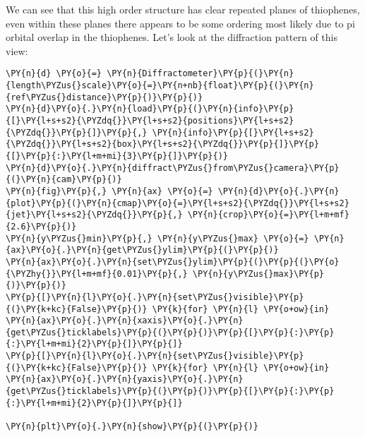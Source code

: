             
    
    \begin{center}
    \end{center}
    

    We can see that this high order structure has clear repeated planes of
thiophenes, even within these planes there appears to be some ordering
most likely due to pi orbital overlap in the thiophenes. Let's look at
the diffraction pattern of this view:

    \begin{tcolorbox}[breakable, size=fbox, boxrule=1pt, pad at break*=1mm,colback=cellbackground, colframe=cellborder]
\begin{Verbatim}[commandchars=\\\{\}]
\PY{n}{d} \PY{o}{=} \PY{n}{Diffractometer}\PY{p}{(}\PY{n}{length\PYZus{}scale}\PY{o}{=}\PY{n+nb}{float}\PY{p}{(}\PY{n}{ref\PYZus{}distance}\PY{p}{)}\PY{p}{)}
\PY{n}{d}\PY{o}{.}\PY{n}{load}\PY{p}{(}\PY{n}{info}\PY{p}{[}\PY{l+s+s2}{\PYZdq{}}\PY{l+s+s2}{positions}\PY{l+s+s2}{\PYZdq{}}\PY{p}{]}\PY{p}{,} \PY{n}{info}\PY{p}{[}\PY{l+s+s2}{\PYZdq{}}\PY{l+s+s2}{box}\PY{l+s+s2}{\PYZdq{}}\PY{p}{]}\PY{p}{[}\PY{p}{:}\PY{l+m+mi}{3}\PY{p}{]}\PY{p}{)}
\PY{n}{d}\PY{o}{.}\PY{n}{diffract\PYZus{}from\PYZus{}camera}\PY{p}{(}\PY{n}{cam}\PY{p}{)}
\PY{n}{fig}\PY{p}{,} \PY{n}{ax} \PY{o}{=} \PY{n}{d}\PY{o}{.}\PY{n}{plot}\PY{p}{(}\PY{n}{cmap}\PY{o}{=}\PY{l+s+s2}{\PYZdq{}}\PY{l+s+s2}{jet}\PY{l+s+s2}{\PYZdq{}}\PY{p}{,} \PY{n}{crop}\PY{o}{=}\PY{l+m+mf}{2.6}\PY{p}{)}
\PY{n}{y\PYZus{}min}\PY{p}{,} \PY{n}{y\PYZus{}max} \PY{o}{=} \PY{n}{ax}\PY{o}{.}\PY{n}{get\PYZus{}ylim}\PY{p}{(}\PY{p}{)}
\PY{n}{ax}\PY{o}{.}\PY{n}{set\PYZus{}ylim}\PY{p}{(}\PY{p}{(}\PY{o}{\PYZhy{}}\PY{l+m+mf}{0.01}\PY{p}{,} \PY{n}{y\PYZus{}max}\PY{p}{)}\PY{p}{)}
\PY{p}{[}\PY{n}{l}\PY{o}{.}\PY{n}{set\PYZus{}visible}\PY{p}{(}\PY{k+kc}{False}\PY{p}{)} \PY{k}{for} \PY{n}{l} \PY{o+ow}{in} \PY{n}{ax}\PY{o}{.}\PY{n}{xaxis}\PY{o}{.}\PY{n}{get\PYZus{}ticklabels}\PY{p}{(}\PY{p}{)}\PY{p}{[}\PY{p}{:}\PY{p}{:}\PY{l+m+mi}{2}\PY{p}{]}\PY{p}{]}
\PY{p}{[}\PY{n}{l}\PY{o}{.}\PY{n}{set\PYZus{}visible}\PY{p}{(}\PY{k+kc}{False}\PY{p}{)} \PY{k}{for} \PY{n}{l} \PY{o+ow}{in} \PY{n}{ax}\PY{o}{.}\PY{n}{yaxis}\PY{o}{.}\PY{n}{get\PYZus{}ticklabels}\PY{p}{(}\PY{p}{)}\PY{p}{[}\PY{p}{:}\PY{p}{:}\PY{l+m+mi}{2}\PY{p}{]}\PY{p}{]}

\PY{n}{plt}\PY{o}{.}\PY{n}{show}\PY{p}{(}\PY{p}{)}
\end{Verbatim}
\end{tcolorbox}

